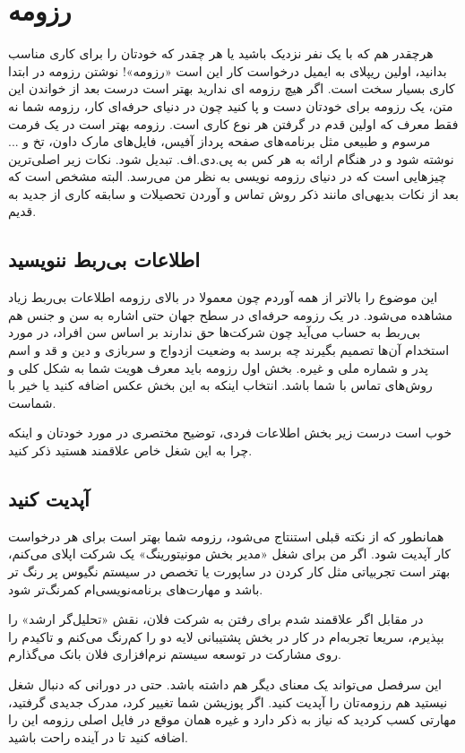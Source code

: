 \section{رزومه}
هرچقدر هم که با یک نفر نزدیک باشید یا هر چقدر که خودتان را برای کاری مناسب بدانید، اولین ریپلای به ایمیل درخواست کار این است «رزومه»! نوشتن رزومه در ابتدا کاری بسیار سخت است. اگر هیچ رزومه ای ندارید بهتر است درست بعد از خواندن این متن، یک رزومه برای خودتان دست و پا کنید چون در دنیای حرفه‌ای کار، رزومه شما نه فقط معرف که اولین قدم در گرفتن هر نوع کاری است. رزومه بهتر است در یک فرمت مرسوم و طبیعی مثل برنامه‌های صفحه پرداز آفیس، فایل‌های مارک داون، تخ و ... نوشته شود و در هنگام ارائه به هر کس به پی‌.دی.اف. تبدیل شود. نکات زیر اصلی‌ترین چیزهایی است که در دنیای رزومه نویسی به نظر من می‌رسد. البته مشخص است که بعد از نکات بدیهی‌ای مانند ذکر روش تماس و آوردن تحصیلات و سابقه کاری از جدید به قدیم.
\subsection*{اطلاعات بی‌ربط ننویسید}
این موضوع را بالاتر از همه آوردم چون معمولا در بالای رزومه اطلاعات بی‌ربط زیاد مشاهده می‌شود. در یک رزومه حرفه‌ای در سطح جهان حتی اشاره به سن و جنس هم بی‌ربط به حساب می‌آید چون شرکت‌ها حق ندارند بر اساس سن افراد، در مورد استخدام آن‌ها تصمیم بگیرند چه برسد به وضعیت ازدواج و سربازی و دین و قد و اسم پدر و شماره ملی و غیره. بخش اول رزومه باید معرف هویت شما به شکل کلی و روش‌های تماس با شما باشد. انتخاب اینکه به این بخش عکس اضافه کنید یا خیر با شماست.

خوب است درست زیر بخش اطلاعات فردی، توضیح مختصری در مورد خودتان و اینکه چرا به این شغل خاص علاقمند هستید ذکر کنید.
\subsection*{آپدیت کنید}
همانطور که از نکته قبلی استنتاج می‌شود، رزومه شما بهتر است برای هر درخواست کار آپدیت شود. اگر من برای شغل «مدیر بخش مونیتورینگ» یک شرکت اپلای می‌کنم، بهتر است تجربیاتی مثل کار کردن در ساپورت یا تخصص در سیستم نگیوس پر رنگ تر باشد و مهارت‌های برنامه‌نویسی‌ام کمرنگ‌تر شود. 

در مقابل اگر علاقمند شدم برای رفتن به شرکت فلان، نقش «تحلیل‌گر ارشد» را بپذیرم، سریعا تجربه‌ام در کار در بخش پشتیبانی لایه دو را کم‌رنگ می‌کنم و تاکیدم را روی مشارکت در توسعه سیستم نرم‌افزاری فلان بانک می‌گذارم.

این سرفصل می‌تواند یک معنای دیگر هم داشته باشد. حتی در دورانی که دنبال شغل نیستید هم رزومه‌تان را آپدیت کنید. اگر پوزیشن شما تغییر کرد، مدرک جدیدی گرفتید، مهارتی کسب کردید که نیاز به ذکر دارد و غیره همان موقع در فایل اصلی رزومه این را اضافه کنید تا در آینده راحت باشید.

